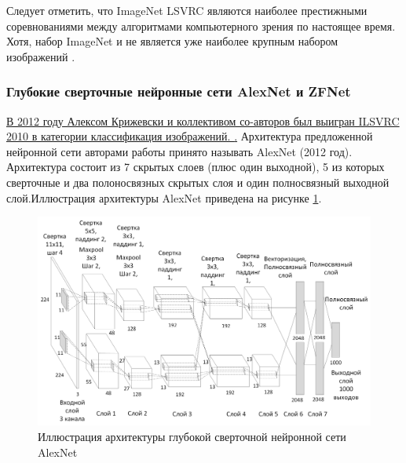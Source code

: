 \documentclass[12pt]{article}
\begin{document}
\begin{sloppypar}
Следует отметить, что ImageNet LSVRC являются наиболее престижными соревнованиями между алгоритмами компьютерного зрения по настоящее время. Хотя, набор ImageNet и не является уже наиболее крупным набором изображений \cite{prabhu2020large}. 
\subsubsection{Глубокие сверточные нейронные сети AlexNet и ZFNet}
\uline{В 2012 году Алексом Крижевски и коллективом со-авторов был выигран ILSVRC 2010 в категории классификация изображений. \cite{krizhevsky2012imagenet}.} 
Архитектура предложенной нейронной сети авторами работы \cite{krizhevsky2012imagenet}  принято называть AlexNet (2012 год). Архитектура состоит из 7 скрытых слоев (плюс один выходной), 5 из которых сверточные и два полоносвязных скрытых слоя и один полносвязный выходной слой.Иллюстрация архитектуры AlexNet приведена на рисунке \ref{ch1:fig:alexnet}. 

\begin{figure}[!h]
	\begin{center}
		\includegraphics[width=0.99\linewidth]{./figuresch1/AlexNet_v1.png}
		\caption{Иллюстрация архитектуры глубокой сверточной нейронной сети AlexNet}	
		\label{ch1:fig:alexnet}
	\end{center}
\end{figure}


\end{sloppypar}
\end{document}
